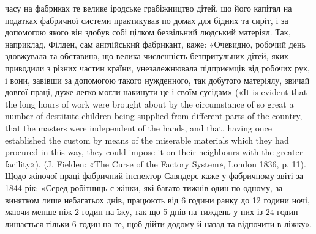 часу на фабриках те велике іродське грабіжництво дітей, що його капітал
на податках фабричної системи практикував по домах для бідних та
сиріт, і за допомогою якого він здобув собі цілком безвільний людський
матеріял. Так, наприклад, Філден, сам англійський фабрикант, каже:
«Очевидно, робочий день здовжувала та обставина, що велика численність
безпритульних дітей, яких приводили з різних частин країни, унезалежнювала
підприємців від робочих рук, і вони, завівши за допомогою такого
нужденного, так добутого матеріялу, звичай довгої праці, дуже легко
могли накинути це і своїм сусідам» («It is evident that the long hours of
work were brought about by the circumstance of so great a number of destitute
children being supplied from different parts of the country, that the
masters were independent of the hands, and that, having once established
the custom by means of the miserable materials which they had procured in
this way, they could impose it on their neighbours with the greater facility»).
(J. Fielden: «The Curse of the Factory System», London 1836, p. 11).
Щодо жіночої праці фабричний інспектор Савндерс каже у фабричному
звіті за 1844 рік: «Серед робітниць є жінки, які багато тижнів один по
одному, за винятком лише небагатьох днів, працюють від 6 години ранку
до 12 години ночі, маючи менше ніж 2 годин на їжу, так що 5 днів на тиждень
у них із 24 годин лишається тільки 6 годин на те, щоб дійти додому
й назад та відпочити в ліжку».
\parbreak{}  %
